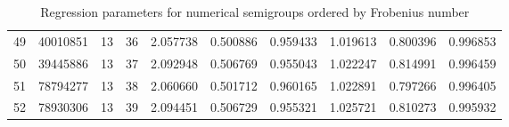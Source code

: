 \documentclass[12pt]{amsart}
\begin{document}
\begin{table}
{\begin{tabular}{|r|rrrrrrrrr|}
\\
 49 &40010851 
& 13
& 36
&  2.057738 & 0.500886 &0.959433	
& 1.019613 & 0.800396 &0.996853	


\\
 50 &39445886 
& 13
& 37
&  2.092948 & 0.506769 &0.955043	
& 1.022247 & 0.814991 &0.996459	


\\
 51 &78794277 
& 13
& 38
&  2.060660 & 0.501712 &0.960165	
& 1.022891 & 0.797266 &0.996405	


\\
 52 &78930306 
& 13
& 39
&  2.094451 & 0.506729 &0.955321	
& 1.025721 & 0.810273 &0.995932	
\\\hline\end{tabular}}

  \caption{Regression parameters for numerical semigroups ordered by Frobenius number}
\label{tab:regressionparameters_xi}
\end{table}
\end{document}
